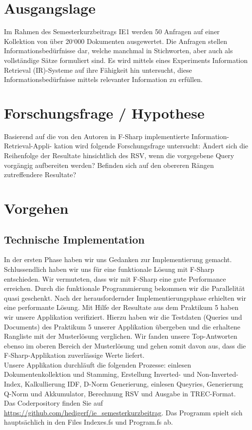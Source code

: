 \documentclass[a4paper, 10pt, ngerman, fleqn]{article}
\begin{document}

%
\setcounter{page}{1}

\section{Ausgangslage}
Im Rahmen des Semesterkurzbeitrags IE1 werden 50 Anfragen auf einer Kollektion von über 20‘000 Dokumenten ausgewertet. Die Anfragen stellen Informationsbedürfnisse dar, welche manchmal in Stichworten, aber auch als vollständige Sätze formuliert sind. Es wird mittels eines Experiments Information Retrieval (IR)-Systeme auf ihre Fähigkeit hin untersucht, diese Informationsbedürfnisse mittels relevanter Information zu \glqq{}erfüllen\grqq{}. 

\section{Forschungsfrage / Hypothese}
Basierend auf die von den Autoren in F-Sharp implementierte Information-Retrieval-Appli- kation wird folgende Forschungsfrage untersucht: \glqq{}Ändert sich die Reihenfolge der Resultate  hinsichtlich des RSV, wenn die vorgegebene Query vorgängig aufbereiten werden? Befinden sich auf den obereren Rängen zutreffendere Resultate?\grqq{}


\section{Vorgehen}
\subsection{Technische Implementation}
In der ersten Phase haben wir uns Gedanken zur Implementierung gemacht. Schlussendlich haben wir uns für eine funktionale Lösung mit F-Sharp entschieden. Wir vermuteten, dass wir mit F-Sharp eine gute Performance erreichen. Durch die funktionale Programmierung bekommen wir die Parallelität quasi geschenkt. Nach der herausfordernder Implementierungsphase erhielten wir eine performante Lösung. Mit Hilfe der Resultate aus dem Praktikum 5 haben wir unsere Applikation verifiziert. Hierzu haben wir die Testdaten (Queries und Documents) des Praktikum 5 unserer Applikation übergeben und die erhaltene Rangliste mit der Musterlösung verglichen. Wir fanden  unsere Top-Antworten ebenso im oberen Bereich der Musterlösung und gehen somit davon aus, dass die F-Sharp-Applikation zuverlässige Werte liefert. \\
Unsere Applikation durchläuft die folgenden Prozesse:
einlesen Dokumentenkollektion und Stamming, Erstellung Inverted- und Non-Inverted-Index, Kalkullierung IDF, D-Norm Generierung, einlesen Queyries, Generierung Q-Norm und Akkumulator, Berechnung RSV und Ausgabe in TREC-Format.\\
Das Coderpository finden Sie auf \url{https://github.com/hedigerf/ie_semesterkurzbeitrag}. 
Das Programm spielt sich hauptsächlich in den Files Indexes.fs und Program.fs ab.
\end{document}
